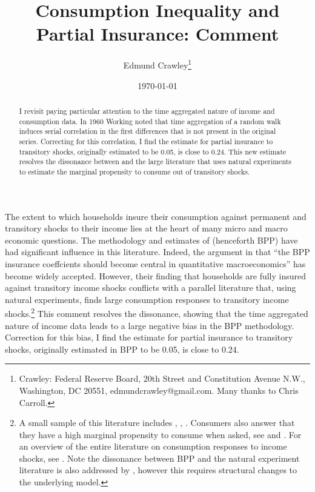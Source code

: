 \documentclass[AER]{AEA}
\begin{document}
\title{Consumption Inequality and Partial Insurance: Comment}
\author{Edmund Crawley\thanks{Crawley: Federal Reserve Board, 20th Street and Constitution Avenue N.W., Washington, DC 20551, edmundcrawley@gmail.com. Many thanks to Chris Carroll.}}
\date{\today}

\begin{abstract}
I revisit \cite{blundell_consumption_2008} paying particular attention to the time aggregated nature of income and consumption data. In 1960 Working noted that time aggregation of a random walk induces serial correlation in the first differences that is not present in the original series. Correcting for this correlation, I find the estimate for partial insurance to transitory shocks, originally estimated to be 0.05, is close to 0.24. This new estimate resolves the dissonance between \cite{blundell_consumption_2008} and the large literature that uses natural experiments to estimate the marginal propensity to consume out of transitory shocks.
\end{abstract}


\maketitle

The extent to which households insure their consumption against permanent and transitory shocks to their income lies at the heart of many micro and macro economic questions. The methodology and estimates of \cite{blundell_consumption_2008} (henceforth BPP) have had significant influence in this literature. Indeed, the argument in \cite{kaplan_how_2010} that ``the BPP insurance coeffcients should become central in quantitative macroeconomics'' has become widely accepted. However, their finding that households are fully insured against transitory income shocks conflicts with a parallel literature that, using natural experiments, finds large consumption responses to transitory income shocks.\footnote{A small sample of this literature includes \cite{parker_consumer_2013}, \cite{agarwal_consumption_2014}, \cite{Sahmetal:2008TaxRebates}. Consumers also answer that they have a high marginal propensity to consume when asked, see \cite{fuster_what_2018} and \cite{jappelli_fiscal_2014}. For an overview of the entire literature on consumption responses to income shocks, see \cite{jappelli_consumption_2010}. Note the dissonance between BPP and the natural experiment literature is also addressed by \cite{commault_how_2017}, however this requires structural changes to the underlying model.} This comment resolves the dissonance, showing that the time aggregated nature of income data leads to a large negative bias in the BPP methodology. Correction for this bias, I find the estimate for partial insurance to transitory shocks, originally estimated in BPP to be 0.05, is close to 0.24.
\end{document}
